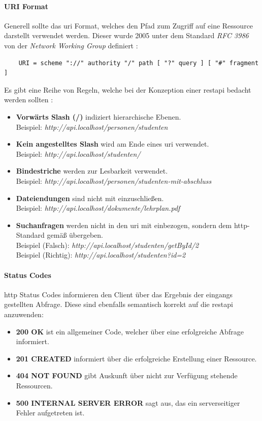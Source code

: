 \paragraph{URI Format}
Generell sollte das \gls{uri} Format, welches den Pfad zum Zugriff auf eine Ressource darstellt verwendet werden. Dieser wurde 2005 unter dem Standard \textit{RFC 3986} von der \textit{Network Working Group} definiert \cite{nwg.2005}:
\begin{verbatim}
    URI = scheme "://" authority "/" path [ "?" query ] [ "#" fragment ]
\end{verbatim}
Es gibt eine Reihe von Regeln, welche bei der Konzeption einer \gls{restapi} bedacht werden sollten \cite{Masse.2012}:
\begin{itemize}
    \item \textbf{Vorwärts Slash (/)} indiziert hierarchische Ebenen. \\
    Beispiel: \textit{http://api.localhost/personen/studenten}
    \item \textbf{Kein angestelltes Slash} wird am Ende eines \gls{uri} verwendet. \\ 
    Beispiel: \textit{http://api.localhost/studenten/}
    \item \textbf{Bindestriche} werden zur Lesbarkeit verwendet.\\
    Beispiel: \textit{http://api.localhost/personen/studenten-mit-abschluss}
    \item \textbf{Dateiendungen} sind nicht mit einzuschließen. \\
    Beispiel: \textit{http://api.localhost/dokumente/lehrplan.pdf}
    \item \textbf{Suchanfragen} werden nicht in den \gls{uri} mit einbezogen, sondern dem \gls{http}-Standard gemäß übergeben.\\
    Beispiel (Falsch): \textit{http://api.localhost/studenten/getById/2} \\
    Beispiel (Richtig): \textit{http://api.localhost/studenten?id=2}
\end{itemize}

\paragraph{Status Codes} \gls{http} Status Codes informieren den Client über das Ergebnis der eingangs gestellten Abfrage. \cite{nwg.1999} Diese sind ebenfalls semantisch korrekt auf die \gls{restapi} anzuwenden:

\begin{itemize}
    \item \textbf{200 OK} ist ein allgemeiner Code, welcher über eine erfolgreiche Abfrage informiert.
    \item \textbf{201 CREATED} informiert über die erfolgreiche Erstellung einer Ressource.
    \item \textbf{404 NOT FOUND} gibt Auskunft über nicht zur Verfügung stehende Ressourcen.
    \item \textbf{500 INTERNAL SERVER ERROR} sagt aus, das ein serverseitiger Fehler aufgetreten ist.
\end{itemize}

